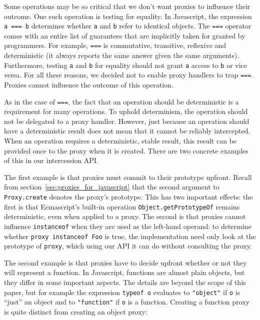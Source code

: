\documentclass{acm_proc_article-sp}
\begin{document}
Some operations may be so critical that we don't want proxies to influence their outcome. One such operation is testing for equality. In Javascript, the expression \texttt{a === b} determines whether \texttt{a} and \texttt{b} refer to identical objects. The \texttt{===} operator comes with an entire list of guarantees that are implicitly taken for granted by programmers. For example, \texttt{===} is commutative, transitive, reflexive and deterministic (it always reports the same answer given the same arguments). Furthermore, testing \texttt{a} and \texttt{b} for equality should not grant \texttt{a} access to \texttt{b} or vice versa. For all these reasons, we decided not to enable proxy handlers to trap \texttt{===}. Proxies cannot influence the outcome of this operation.

As in the case of \texttt{===}, the fact that an operation should be deterministic is a requirement for many operations. To uphold determinism, the operation should not be delegated to a proxy handler. However, just because an operation should have a deterministic result does not mean that it cannot be reliably intercepted. When an operation requires a deterministic, stable result, this result can be provided once to the proxy when it is created. There are two concrete examples of this in our intercession API.

The first example is that proxies must commit to their prototype upfront. Recall from section~\ref{sec:proxies_for_javascript} that the second argument to \texttt{Proxy.create} denotes the proxy's prototype. This has two important effects: the first is that Ecmascript's built-in operation \texttt{Object.getPrototypeOf} remains deterministic, even when applied to a proxy. The second is that proxies cannot influence \texttt{instanceof} when they are used as the left-hand operand: to determine whether \texttt{proxy instanceof Foo} is true, the implementation need only look at the prototype of \texttt{proxy}, which using our API it can do without consulting the proxy.

The second example is that proxies have to decide upfront whether or not they will represent a function. In Javascript, functions are almost plain objects, but they differ in some important aspects. The details are beyond the scope of this paper, but for example the expression \texttt{typeof o} evaluates to \texttt{"object"} if \texttt{o} is ``just'' an object and to \texttt{"function"} if \texttt{o} is a function. Creating a function proxy is quite distinct from creating an object proxy:
\end{document}
